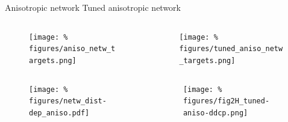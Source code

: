 
\begin{frame}{\LARGE \hspace{1.05cm} Anisotropic network \hspace{1.5cm} Tuned anisotropic network}
  \vspace{-0.8cm}
  \begin{columns}
    \begin{column}{.5\textwidth}
      \minipage[c][0.45\textheight][s]{\columnwidth}

      \begin{figure}
        \centering
        \texttt{[image: \%
          figures/aniso\_netw\_targets.png]} %
      \end{figure}
      
      
      \endminipage      
    \end{column}
    \begin{column}{.5\textwidth}
      \minipage[c][0.45\textheight][s]{\columnwidth}

      \begin{figure}
        \centering
        \texttt{[image: \%
          figures/tuned\_aniso\_netw\_targets.png]} %
      \end{figure}
      
      \endminipage
    \end{column}
  \end{columns}

  \vspace{-0.6cm}
  
  \begin{columns}
    \begin{column}{.5\textwidth}
      \minipage[c][0.25\textheight][s]{\columnwidth}

      \begin{figure}
        \centering
        \texttt{[image: \%
          figures/netw\_dist-dep\_aniso.pdf]} %
      \end{figure}

      
      
      \endminipage      
    \end{column}
    \begin{column}{.5\textwidth}
      \minipage[c][0.25\textheight][s]{\columnwidth}

      \begin{figure}
        \centering
        \texttt{[image: \%
          figures/fig2H\_tuned-aniso-ddcp.png]} %
      \end{figure}

      
      
      \endminipage      
      
      
    \end{column}
  \end{columns}
  


  
\end{frame}





